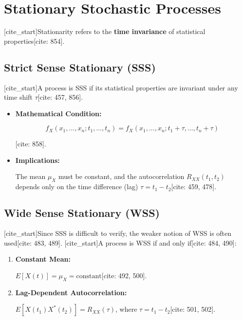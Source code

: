 \documentclass{article}
\begin{document}
\section{Stationary Stochastic Processes}

[cite\_start]Stationarity refers to the \textbf{time invariance} of statistical properties[cite: 854].

\subsection{Strict Sense Stationary (SSS)}

[cite\_start]A process is SSS if its statistical properties are invariant under any time shift $\tau$[cite: 457, 856].

\begin{itemize}

\item [cite\_start]\textbf{Mathematical Condition:}

\[
f_X(x_1, ..., x_n; t_1, ..., t_n)
=
f_X(x_1, ..., x_n; t_1 + \tau, ..., t_n + \tau)
\]

[cite: 858].

\item [cite\_start]\textbf{Implications:}

The mean $\mu_X$ must be constant, and the autocorrelation $R_{XX}(t_1, t_2)$ depends only on the time difference (lag) $\tau = t_1 - t_2$[cite: 459, 478].

\end{itemize}

\subsection{Wide Sense Stationary (WSS)}

[cite\_start]Since SSS is difficult to verify, the weaker notion of WSS is often used[cite: 483, 489]. [cite\_start]A process is WSS if and only if[cite: 484, 490]:

\begin{enumerate}

\item [cite\_start]\textbf{Constant Mean:}

$E[X(t)] = \mu_X = \text{constant}$[cite: 492, 500].

\item [cite\_start]\textbf{Lag-Dependent Autocorrelation:}

$E[X(t_1)X^*(t_2)] = R_{XX}(\tau)$, where $\tau = t_1 - t_2$[cite: 501, 502].

\end{enumerate}
\end{document}
